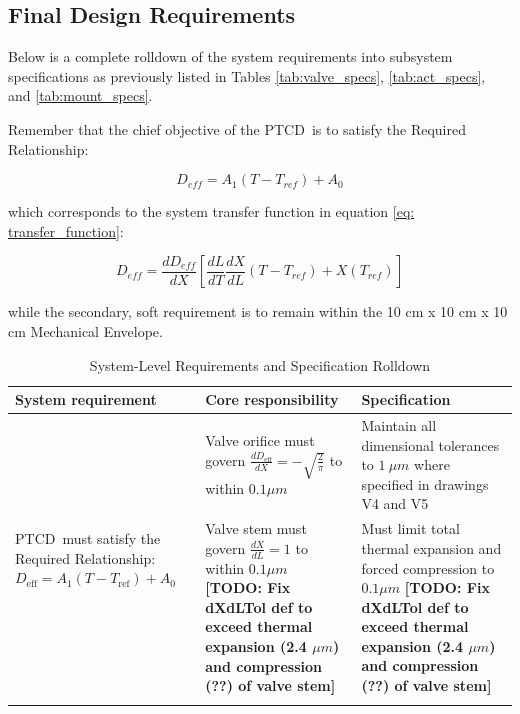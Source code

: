 \documentclass[12pt, letterpaper]{report}%
\newcounter{mycounter}           %
\newcounter{sub}[mycounter]      %
\newcommand{\device}{PTCD}
\newcommand{\dDdXTol}{$0.1 \mu m$}
\newcommand{\dXdLTol}{$0.1 \mu m$ \todo{Fix dXdLTol def to exceed thermal expansion (2.4 $\mu m$) and compression (??) of valve stem}}
\newcommand{\todo}[1]{{\bfseries\color{red}[TODO: #1]}}
\begin{document}
\newpage
\begin{appendices}
\appendix

\chapter{Final Design Requirements}
\label{app:requirements}

    Below is a complete rolldown of the system requirements into subsystem specifications
    as previously listed in Tables \ref{tab:valve_specs}, \ref{tab:act_specs}, and \ref{tab:mount_specs}.

    Remember that the chief objective of the \device\ is to satisfy the Required Relationship:

        $$D_{eff} = A_1(T - T_{ref}) + A_0$$

    which corresponds to the system transfer function in equation \ref{eq: transfer_function}:

        $$D_{eff}=\frac{dD_{eff}}{dX} \left[\frac{dL}{dT}\frac{dX}{dL}(T-T_{ref})+X\left(T_{ref} \right) \right]$$

    while the secondary, soft requirement is to remain within the 10 cm x 10 cm x 10 cm Mechanical Envelope.


\newpage
\enlargethispage{4cm}
\begin{table}[H]
    \centering
    \caption{System-Level Requirements and Specification Rolldown}
    \label{tab:system_specs}
    \renewcommand{\arraystretch}{1.4}
    \begin{tabular}{|m{}|m{}|m{}|}

        \hline
        \textbf{System requirement}
            &
        \textbf{Core responsibility}
            &
        \textbf{Specification} \\

        \hline

        \multirow[c]{9}{0.2\textwidth}{%
            \device\ must satisfy the Required Relationship:
            $D_{\text{eff}} = A_1(T - T_{\text{ref}}) + A_0$
        }
            &
        Valve orifice must govern $\frac{dD_{\text{eff}}}{dX} = -\sqrt{\frac{2}{\pi}}$ to within \dDdXTol\
            &
        Maintain all dimensional tolerances to $1\ \mu m$ where specified in drawings V4 and V5
        \\ \cline{2-3}

            &
        Valve stem must govern $\frac{dX}{dL} = 1$ to within \dXdLTol\
            &
        Must limit total thermal expansion and forced compression to \dXdLTol
        \\ \cline{2-3}


\end{tabular}
\end{table}
\end{appendices}
\end{document}

